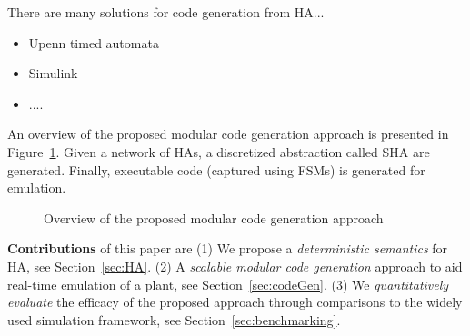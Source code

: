 There are many solutions for code generation from \acf{HA}...
\begin{itemize}
	\item Upenn timed automata
	\item Simulink
	\item ....
\end{itemize}
 

   
 An overview of the proposed modular code generation approach is presented
 in Figure~\ref{fig:overview}. Given a network
 of \acp{HA}, a discretized abstraction called \ac{SHA} are generated.
 Finally, executable code (captured using \acp{FSM}) is generated for emulation.
 
 \begin{figure}[bthp]
 	\centering
 	\scalebox{0.7}{
	 
	}
	 \caption{Overview of the proposed modular 
	 	code generation approach \label{fig:overview}}
\end{figure}
      
\textbf{Contributions} of this paper are 
(1) We propose a \emph{deterministic semantics} for \acf{HA}, see Section~\ref{sec:HA}.
(2) A \emph{scalable modular code generation} approach 
to aid real-time emulation of a plant, see Section~\ref{sec:codeGen}.
(3) We \emph{quantitatively evaluate} the efficacy of the 
proposed approach through comparisons  
to the widely used \simulink
simulation framework, see Section~\ref{sec:benchmarking}.
 
